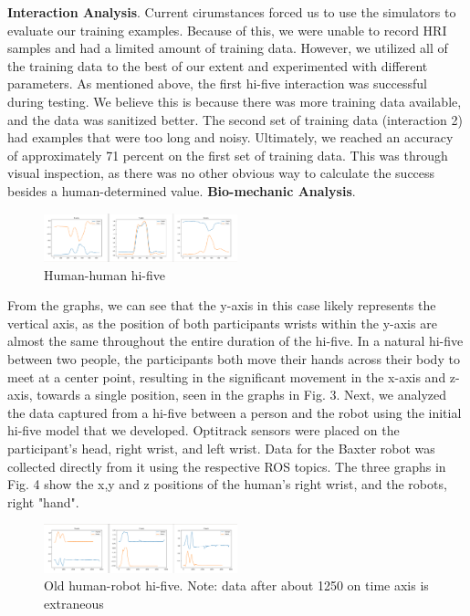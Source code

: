 \documentclass[letterpaper, 10 pt, conference]{ieeeconf}  %
\begin{document}
\textbf{Interaction Analysis}. Current cirumstances forced us to use the simulators to evaluate our training examples. Because of this, we were unable to record HRI samples and had a limited amount of training data. However, we utilized all of the training data to the best of our extent and experimented with different parameters. As mentioned above, the first hi-five interaction was successful during testing. We believe this is because there was more training data available, and the data was sanitized better. The second set of training data (interaction 2) had examples that were too long and noisy. Ultimately, we reached an accuracy of approximately 71 percent on the first set of training data. This was through visual inspection, as there was no other obvious way to calculate the success besides a human-determined value.
\newline
\newline
\textbf{Bio-mechanic Analysis}.
\begin{figure}[h]
\centering
\includegraphics[width=0.5\textwidth]{biomechanics.png}
\caption{Human-human hi-five}
\end{figure} 
\newline
\indent From the graphs, we can see that the y-axis in this case likely represents the vertical axis, as the position of both participants wrists within the y-axis are almost the same throughout the entire duration of the hi-five. In a natural hi-five between two people, the participants both move their hands across their body to meet at a center point, resulting in the significant movement in the x-axis and z-axis, towards a single position, seen in the graphs in Fig. 3.
\newline
\indent Next, we analyzed the data captured from a hi-five between a person and the robot using the initial hi-five model that we developed. Optitrack sensors were placed on the participant's head, right wrist, and left wrist. Data for the Baxter robot was collected directly from it using the respective ROS topics. The three graphs in Fig. 4 show the x,y and z positions of the human's right wrist, and the robots, right "hand".
\begin{figure}[h]
\centering
\includegraphics[width=0.5\textwidth]{oldfive.png}
\caption{Old human-robot hi-five. Note: data after about 1250 on time axis is extraneous}
\end{figure}
\end{document}

